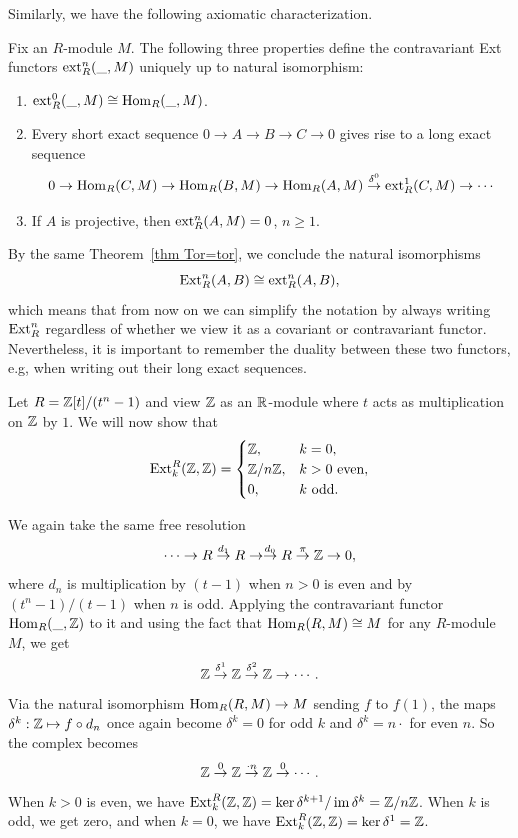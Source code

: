 Similarly, we have the following axiomatic characterization.

\begin{thm}
    Fix an $R$-module $M$. The following three properties define the contravariant Ext functors $\operatorname{ext}_R^n(\_,M)$ uniquely up to natural isomorphism: 
    \begin{enumerate}
        \item $\operatorname{ext}^0_R(\_,M)\cong\operatorname{Hom}_R(\_,M)$.
        \item Every short exact sequence $0\to A\to B\to C\to 0$ gives rise to a long exact sequence 
        \[0\to \operatorname{Hom}_R(C,M)\to \operatorname{Hom}_R(B,M)\to \operatorname{Hom}_R(A,M)\overset{\delta^0}{\to} \operatorname{ext}^1_R(C,M)\to\cdots \]
        \item If $A$ is projective, then $\operatorname{ext}_R^n(A,M)=0$, $n\geq 1$.
    \end{enumerate}
\end{thm}

By the same Theorem~\ref{thm Tor=tor}, we conclude the natural isomorphisms
\[\operatorname{Ext}^n_R(A,B)\cong \operatorname{ext}^n_R(A,B),\]
which means that from now on we can simplify the notation by always writing $\operatorname{Ext}_R^n$ regardless of whether we view it as a covariant or contravariant functor. Nevertheless, it is important to remember the duality between these two functors, e.g, when writing out their long exact sequences.


\begin{example}[Continuation of Example~\ref{example Tor with R=Z[t]/(tn-1)}]
    Let $R=\mathbb{Z}[t]\slash(t^n-1)$ and view $\mathbb{Z}$ as an $\mathbb{R}$-module where $t$ acts as multiplication on $\mathbb{Z}$ by $1$. We will now show that
        \[\operatorname{Ext}_k^R(\mathbb{Z},\mathbb{Z})=\begin{cases}
            \mathbb{Z},&k=0,\\
            \mathbb{Z}\slash n\mathbb{Z},&k>0\text{ even},\\
            0,& k\text{ odd}.
        \end{cases}\]

    We again take the same free resolution
    \[\cdots\to R\overset{d_1}{\to}R\to \overset{d_0}{\to}R \overset{\pi}{\to}\mathbb{Z}\to 0,\]
    where $d_n$ is multiplication by $(t-1)$ when $n>0$ is even and by $(t^n-1)/(t-1)$ when $n$ is odd. Applying the contravariant functor $\operatorname{Hom}_R(\_,\mathbb{Z})$ to it and using the fact that $\operatorname{Hom}_R(R,M)\cong M$ for any $R$-module $M$, we get
    \[\mathbb{Z}\overset{\delta^1}{\to}\mathbb{Z} \overset{\delta^2}{\to}\mathbb{Z}\to\cdots .\]
    Via the natural isomorphism $\operatorname{Hom}_R(R,M)\to M$ sending $f$ to $f(1)$, the maps $\delta^k:\mathbb{Z}\mapsto f\circ d_n$ once again become $\delta^k=0$ for odd $k$ and $\delta^k=n\cdot$ for even $n$. So the complex becomes
    \[\mathbb{Z}\overset{0}{\to}\mathbb{Z}\overset{\cdot n}{\to}\mathbb{Z}\overset{0}{\to}\cdots.\]
    When $k>0$ is even, we have $\operatorname{Ext}_k^R(\mathbb{Z},\mathbb{Z})=\ker \delta^{k+1}\slash \operatorname{im}\delta^k=\mathbb{Z}\slash n\mathbb{Z}$. When $k$ is odd, we get zero, and when $k=0$, we have $\operatorname{Ext}^R_k(\mathbb{Z},\mathbb{Z})=\ker \delta^1=\mathbb{Z}$. 
\end{example}


